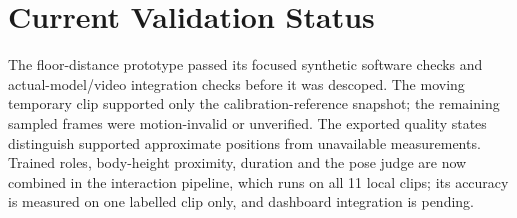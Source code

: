 \section{Current Validation Status}
The floor-distance prototype passed its focused synthetic software checks and actual-model/video integration checks before it was descoped. The moving temporary clip supported only the calibration-reference snapshot; the remaining sampled frames were motion-invalid or unverified. The exported quality states distinguish supported approximate positions from unavailable measurements. Trained roles, body-height proximity, duration and the pose judge are now combined in the interaction pipeline, which runs on all 11 local clips; its accuracy is measured on one labelled clip only, and dashboard integration is pending.
